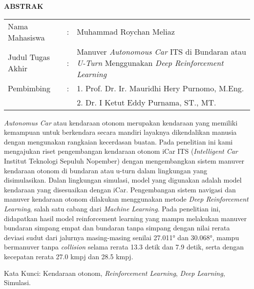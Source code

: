 \begin{center}
  \large\textbf{ABSTRAK}
\end{center}


\vspace{2ex}

\begingroup
  \setlength{\tabcolsep}{0pt}

  \noindent
  \begin{tabularx}{\textwidth}{l >{\centering}m{2em} X}
    Nama Mahasiswa    &:& Muhammad Roychan Meliaz \\

    Judul Tugas Akhir &:&	Manuver \textit{Autonomous Car} ITS di Bundaran atau \textit{U-Turn} Menggunakan \textit{Deep Reinforcement Learning} \\

    Pembimbing        &:& 1. Prof. Dr. Ir. Mauridhi Hery Purnomo, M.Eng. \\
                      & & 2. Dr. I Ketut Eddy Purnama, ST., MT. \\
  \end{tabularx}
\endgroup

\textit{Autonomus Car }atau kendaraan otonom merupakan kendaraan yang memiliki kemampuan untuk berkendara secara mandiri layaknya dikendalikan manusia dengan mengunakan rangkaian kecerdasan buatan. Pada penelitian ini kami mengajukan riset pengembangan kendaraan otonom iCar ITS (\textit{Intelligent Car }Institut Teknologi Sepuluh Nopember) dengan mengembangkan sistem manuver kendaraan otonom di bundaran atau u-turn dalam lingkungan yang disimulasikan. Dalan lingkungan simulasi, model yang digunakan adalah model kendaraan yang disesuaikan dengan iCar. Pengembangan sistem navigasi dan manuver kendaraan otonom dilakukan menggunakan metode \textit{Deep Reinforcement Learning}, salah satu cabang dari \textit{Machine Learning}. Pada penelitian ini, didapatkan hasil model reinforcement learning yang mampu melakukan manuver bundaran simpang empat dan bundaran tanpa simpang dengan nilai rerata deviasi sudut dari jalurnya masing-masing senilai 27.011° dan 30.068°, mampu bermanuver tanpa \textit{collision} selama rerata 13.3 detik dan 7.9 detik, serta dengan kecepatan rerata 27.0 kmpj dan 28.5 kmpj.

\iffalse
Dari penelitian ini diharapkan dapat dihasilkannya algoritma \textit{reinforcement learning }pada mobil otonom yang mampu melakukan manuver di bundaran atau u-turn dengan efisien.
\fi

Kata Kunci: Kendaraan otonom, \textit{Reinforcement Learning}, \textit{Deep Learning}, Simulasi.
